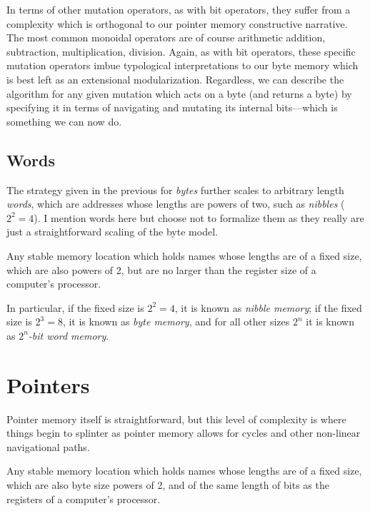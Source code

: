 \documentclass[twoside]{article}
\newenvironment{definition}[1][Definition]{\begin{trivlist}
\item[\hskip \labelsep {\bfseries #1:}]}{\end{trivlist}}
\begin{document}
In terms of other mutation operators, as with bit operators, they suffer from a complexity which is orthogonal to
our pointer memory constructive narrative. The most common monoidal operators are of course arithmetic addition,
subtraction, multiplication, division. Again, as with bit operators, these specific mutation operators imbue
typological interpretations to our byte memory which is best left as an extensional modularization.
Regardless, we can describe the algorithm for any given mutation which acts on a byte (and returns a byte)
by specifying it in terms of navigating and mutating its internal bits---which is something we can now do.

\subsection*{Words}

The strategy given in the previous for \emph{bytes} further scales to arbitrary length \emph{words}, which are addresses
whose lengths are powers of two, such as \emph{nibbles} ($ 2^2=4 $). I mention words here but choose not to formalize them
as they really are just a straightforward scaling of the byte model.

\begin{definition}[Word Memory]
Any stable memory location which holds names whose lengths are of a fixed size, which are also powers of 2, but are
no larger than the register size of a computer's processor.

In particular, if the fixed size is $ 2^2=4 $, it is known as \emph{nibble memory}; if the fixed size is $ 2^3=8 $,
it is known as \emph{byte memory}, and for all other sizes $ 2^n $ it is known as \emph{$ 2^n $-bit word memory}.
\end{definition}

\section*{Pointers}

Pointer memory itself is straightforward, but this level of complexity is where things
begin to splinter as pointer memory allows for cycles and other non-linear navigational paths.

\begin{definition}[Pointer Memory]
Any stable memory location which holds names whose lengths are of a fixed size, which are also byte size powers of 2,
and of the same length of bits as the registers of a computer's processor.
\end{definition}
\end{document}
